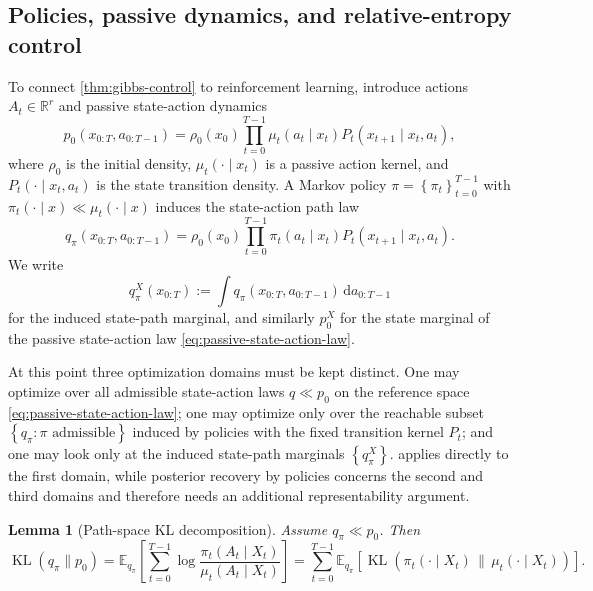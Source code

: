 \documentclass[11pt]{article}
\newcommand{\R}{\mathbb{R}}
\newcommand{\E}{\mathbb{E}}
\newcommand{\KL}{\operatorname{KL}}
\newcommand{\dd}{\,\mathrm d}
\newcommand{\xtraj}{x_{0:T}}
\newcommand{\atraj}{a_{0:T-1}}
\newcommand{\qpi}{q_\pi}
\newcommand{\set}[1]{\left\{ #1 \right\}}
\newcommand{\bracks}[1]{\left[ #1 \right]}
\newcommand{\parens}[1]{\left( #1 \right)}
\numberwithin{equation}{section}
\theoremstyle{plain}
\newtheorem{lemma}[theorem]{Lemma}
\theoremstyle{definition}
\theoremstyle{remark}
\begin{document}
\subsection{Policies, passive dynamics, and relative-entropy control}

To connect \cref{thm:gibbs-control} to reinforcement learning, introduce actions $A_t\in\R^r$ and passive state-action dynamics
\begin{equation}
p_0(\xtraj,\atraj)
=
\rho_0(x_0)\prod_{t=0}^{T-1}\mu_t(a_t\mid x_t)P_t(x_{t+1}\mid x_t,a_t),
\label{eq:passive-state-action-law}
\end{equation}
where $\rho_0$ is the initial density, $\mu_t(\cdot\mid x_t)$ is a passive action kernel, and $P_t(\cdot\mid x_t,a_t)$ is the state transition density. A Markov policy $\pi=\set{\pi_t}_{t=0}^{T-1}$ with $\pi_t(\cdot\mid x)\ll \mu_t(\cdot\mid x)$ induces the state-action path law
\begin{equation}
\qpi(\xtraj,\atraj)
=
\rho_0(x_0)\prod_{t=0}^{T-1}\pi_t(a_t\mid x_t)P_t(x_{t+1}\mid x_t,a_t).
\label{eq:policy-path-law}
\end{equation}
We write
\begin{equation}
\qpi^X(\xtraj)
:=
\int \qpi(\xtraj,\atraj)\dd \atraj
\end{equation}
for the induced state-path marginal, and similarly $p_0^X$ for the state marginal of the passive state-action law \cref{eq:passive-state-action-law}.

At this point three optimization domains must be kept distinct. One may optimize over all admissible state-action laws $q\ll p_0$ on the reference space \cref{eq:passive-state-action-law}; one may optimize only over the reachable subset $\set{\qpi:\pi\text{ admissible}}$ induced by policies with the fixed transition kernel $P_t$; and one may look only at the induced state-path marginals $\set{\qpi^X}$.  applies directly to the first domain, while posterior recovery by policies concerns the second and third domains and therefore needs an additional representability argument.

\begin{lemma}[Path-space KL decomposition]
\label{lem:policy-kl}
Assume $\qpi\ll p_0$. Then
\begin{equation}
\KL(\qpi\|p_0)
=
\E_{\qpi}\!\left[\sum_{t=0}^{T-1}\log\frac{\pi_t(A_t\mid X_t)}{\mu_t(A_t\mid X_t)}\right]
=
\sum_{t=0}^{T-1}\E_{\qpi}\!\bracks{\KL\parens{\pi_t(\cdot\mid X_t)\,\|\,\mu_t(\cdot\mid X_t)}}.
\label{eq:policy-kl-decomp}
\end{equation}
\end{lemma}
\end{document}
